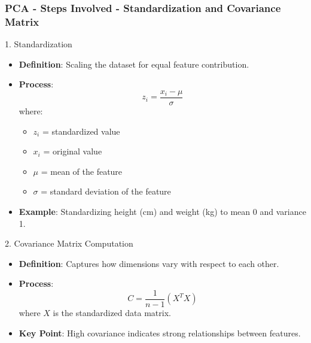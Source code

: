\documentclass{beamer}
\begin{document}
\begin{frame}[fragile]
    \frametitle{PCA - Steps Involved - Standardization and Covariance Matrix}
    \begin{block}{1. Standardization}
        \begin{itemize}
            \item \textbf{Definition}: Scaling the dataset for equal feature contribution.
            \item \textbf{Process}:
            \begin{equation}
            z_i = \frac{x_i - \mu}{\sigma}
            \end{equation}
            where:
            \begin{itemize}
                \item \(z_i\) = standardized value
                \item \(x_i\) = original value
                \item \(\mu\) = mean of the feature
                \item \(\sigma\) = standard deviation of the feature
            \end{itemize}
            \item \textbf{Example}: Standardizing height (cm) and weight (kg) to mean 0 and variance 1.
        \end{itemize}
    \end{block}

    \begin{block}{2. Covariance Matrix Computation}
        \begin{itemize}
            \item \textbf{Definition}: Captures how dimensions vary with respect to each other.
            \item \textbf{Process}:
            \begin{equation}
            C = \frac{1}{n-1} (X^T X)
            \end{equation}
            where \(X\) is the standardized data matrix.
            \item \textbf{Key Point}: High covariance indicates strong relationships between features.
        \end{itemize}
    \end{block}
\end{frame}
\end{document}
